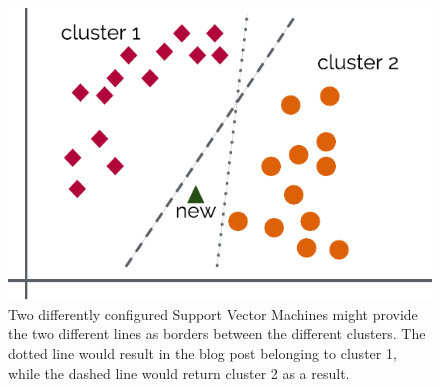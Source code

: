 \begin{figure}
    \centering
    \includegraphics[]{images/svm.pdf}
    \caption{Two differently configured Support Vector Machines might provide the two different lines as borders between the different clusters. The dotted line would result in the blog post belonging to cluster 1, while the dashed line would return cluster 2 as a result.}
    \label{fig:svm}
\end{figure}
